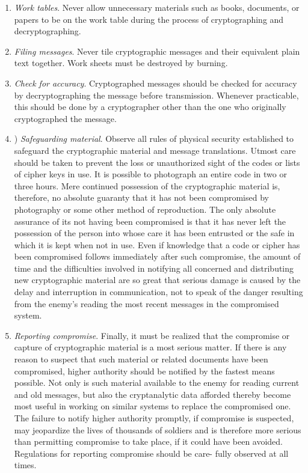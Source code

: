 \begin{enumerate}
\item \textit{Work tables}. Never allow unnecessary materials such as
books, documents, or papers to be on the work table during the
process of cryptographing and decryptographing.
\item  \textit{Filing messages}. Never tile cryptographic messages and their
equivalent plain text together. Work sheets must be destroyed
by burning.
\item \textit{Check for accuracy}. Cryptographed messages should be
checked for accuracy by decryptographing the message before
transmission. Whenever practicable, this should be done by a
cryptographer other than the one who originally cryptographed
the message.
\item) \textit{Safeguarding material}. Observe all rules of physical security
established to safeguard the cryptographic material and message
translations. Utmost care should be taken to prevent the loss
or unauthorized sight of the codes or lists of cipher keys in
use. It is possible to photograph an entire code in two or three
hours. Mere continued possession of the cryptographic material
is, therefore, no absolute guaranty that it has not been compromised by photography or some other method of reproduction.
The only absolute assurance of its not having been compromised is that it has never left the possession of the person into
whose care it has been entrusted or the safe in which it is kept
when not in use. Even if knowledge that a code or cipher has
been compromised follows immediately after such compromise,
the amount of time and the diﬂiculties involved in notifying all
concerned and distributing new cryptographic material are so
great that serious damage is caused by the delay and interruption in communication, not to speak of the danger resulting
from the enemy’s reading the most recent messages in the compromised system.

\item \textit{Reporting compromise}. Finally, it must be realized that the
compromise or capture of cryptographic material is a most
serious matter. If there is any reason to suspect that such
material or related documents have been compromised, higher
authority should be notiﬁed by the fastest means possible. Not
only is such material available to the enemy for reading current
and old messages, but also the cryptanalytic data afforded
thereby become most useful in working on similar systems to
replace the compromised one. The failure to notify higher
authority promptly, if compromise is suspected, may jeopardize
the lives of thousands of soldiers and is therefore more serious
than permitting compromise to take place, if it could have been
avoided. Regulations for reporting compromise should be care-
fully observed at all times.

\end{enumerate}
